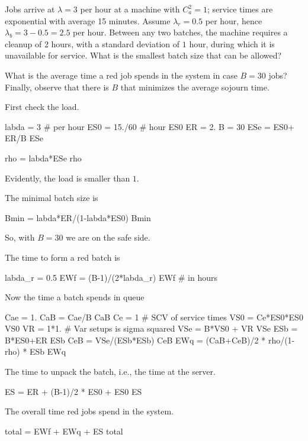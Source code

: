 \begin{exercise}
  Jobs arrive at $\lambda=3$ per hour at a machine with $C_a^2=1$; service times are exponential with average 15 minutes.  Assume $\lambda_r = 0.5$ per hour, hence $\lambda_b = 3-0.5=2.5$ per hour. Between any two batches, the machine requires a cleanup of 2 hours, with a standard deviation of $1$ hour, during which it is unavailable for service.
  What is the smallest batch size that can be allowed?

  What is the average time a red job spends in the system in case $B=30$ jobs?
  Finally, observe that there is $B$ that minimizes the average sojourn time.
\begin{solution}
First check the load.
\begin{pyconsole}
labda = 3 # per hour
ES0 = 15./60 # hour
ES0
ER = 2.
B = 30
ESe = ES0+ ER/B
ESe

rho = labda*ESe
rho
\end{pyconsole}
Evidently, the load is smaller than $1$. 

The minimal batch size is
\begin{pyconsole}
Bmin = labda*ER/(1-labda*ES0)
Bmin
\end{pyconsole}
So, with $B=30$ we are on the safe side. 

The time to form a red batch is 
\begin{pyconsole}
labda_r = 0.5
EWf = (B-1)/(2*labda_r)
EWf # in hours
\end{pyconsole}

Now the time a batch spends in queue
\begin{pyconsole}
Cae = 1.
CaB = Cae/B
CaB
Ce = 1 # SCV of service times
VS0 = Ce*ES0*ES0
VS0
VR = 1*1. # Var setups is sigma squared
VSe = B*VS0 + VR
VSe
ESb = B*ES0+ER
ESb
CeB = VSe/(ESb*ESb)
CeB
EWq = (CaB+CeB)/2 * rho/(1-rho) * ESb
EWq
\end{pyconsole}

The time to unpack the batch, i.e., the time at the server. 
\begin{pyconsole}
ES = ER + (B-1)/2 * ES0 + ES0  
ES
\end{pyconsole}


The overall time red jobs spend in the system.
\begin{pyconsole}
total = EWf + EWq + ES
total
\end{pyconsole}

\end{solution}
\end{exercise}

